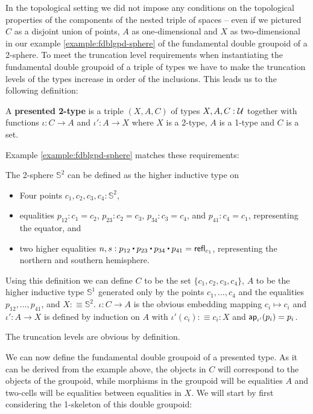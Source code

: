 In the topological setting we did not impose any conditions on the topological
properties of the components of the nested triple of spaces -- even if we pictured
$C$ as a disjoint union of points, $A$ as one-dimensional and $X$ as two-dimensional
in our example \ref{example:fdblgpd-sphere} of the fundamental double groupoid
of a 2-sphere.
To meet the truncation level requirements when instantiating the fundamental
double groupoid of a triple of types we have to make the truncation levels of the
types increase in order of the inclusions.
This leads us to the following definition:

\begin{defn}
A \textbf{presented 2-type} is a triple $(X,A,C)$ of types $X, A, C : \mathcal{U}$ together
with functions $\iota : C \to A$ and $\iota' : A \to X$ where $X$ is a 2-type,
$A$ is a 1-type and $C$ is a set.
\end{defn}

Example \ref{example:fdblgpd-sphere} matches these requirements:

\begin{example}
The 2-sphere $\mathbb{S}^2$ can be defined as the higher inductive type on
\begin{itemize}
\item Four points $c_1, c_2, c_3, c_4 : \mathbb{S}^2$,
\item equalities $p_{12} : c_1 = c_2$, $p_{23} : c_2 = c_3$, $p_{34} : c_3 = c_4$,
	and $p_{41} : c_4 = c_1$, representing the equator, and
\item two higher equalities $n,s:p_{12} \ct p_{23} \ct p_{34} \ct p_{41} = \refl_{c_1}$,
representing the northern and southern hemisphere.
\end{itemize}
Using this definition we can define $C$ to be the set $\{c_1,c_2,c_3,c_4\}$,
$A$ to be the higher inductive type $\mathbb{S}^1$ generated only by the points $c_1, \ldots,
c_4$ and the equalities $p_{12}, \ldots, p_{41}$, and $X :\equiv \mathbb{S}^2$.
$\iota : C \to A$ is the obvious embedding mapping $c_i \mapsto c_i$ and
$\iota' : A \to X$ is defined by induction on $A$ with $\iota'(c_i) :\equiv c_i : X$
and $\mathsf{ap}_{\iota'}(p_i) = p_i$.

The truncation levels are obvious by definition. %
\end{example}

We can now define the fundamental double groupoid of a presented type.
As it can be derived from the example above, the objects in $C$ will correspond
to the objects of the groupoid, while morphisms in the groupoid will be
equalities $A$ and two-cells will be equalities between equalities in $X$.
We will start by first considering the 1-skeleton of this double groupoid:

